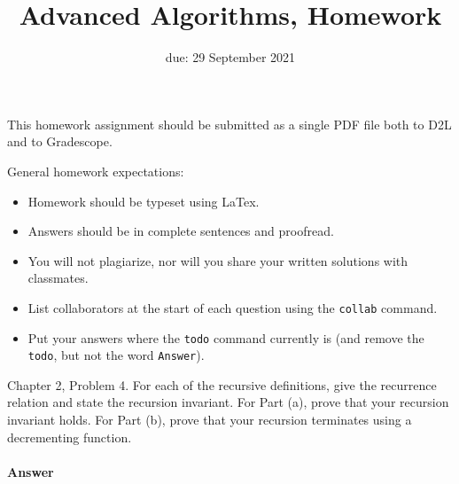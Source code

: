 \documentclass{article}
\title{Advanced Algorithms, Homework \hwnum}
\author{\todo{Your Name Here}}
\date{due: 29 September 2021}
\begin{document}
\maketitle

This homework assignment should be
submitted as a single PDF file both to D2L and to Gradescope.

General homework expectations:
\begin{itemize}
    \item Homework should be typeset using LaTex.
    \item Answers should be in complete sentences and proofread.
    \item You will not plagiarize, nor will you share your written solutions
        with classmates.
    \item List collaborators at the start of each question using the
        \texttt{collab} command.
    \item Put your answers where the \texttt{todo} command currently is (and
        remove the \texttt{todo}, but not the word \texttt{Answer}).
\end{itemize}



\collab{\todo{}}

Chapter 2, Problem 4. For each of the recursive definitions, give the recurrence
relation and state the recursion invariant.  For Part (a), prove that your
recursion invariant holds.  For Part (b), prove that your recursion terminates
using a decrementing function.

\paragraph{Answer}

\todo{}
\end{document}
